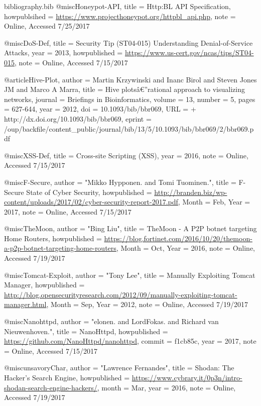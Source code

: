 \begin{filecontents}{bibliography.bib}
@misc{Honeypot-API,
    title = {{Http:BL API Specification}},
    howpublsihed = {\url{https://www.projecthoneypot.org/httpbl_api.php}},
    note = {Online, Accessed 7/25/2017}
}

@misc{DoS-Def,
    title = {{Security Tip (ST04-015) Understanding Denial-of-Service Attacks}},
    year = {2013},
    howpublished = {\url{https://www.us-cert.gov/ncas/tips/ST04-015}},
    note = {Online, Accessed 7/15/2017}
}

@article{Hive-Plot,
    author = {Martin Krzywinski and Inanc Birol and Steven Jones JM and Marco A Marra},
    title = {Hive plotsâ€”rational approach to visualizing networks},
    journal = {Briefings in Bioinformatics},
    volume = {13},
    number = {5},
    pages = {627-644},
    year = {2012},
    doi = {10.1093/bib/bbr069},
    URL = { + http://dx.doi.org/10.1093/bib/bbr069},
    eprint = {/oup/backfile/content_public/journal/bib/13/5/10.1093/bib/bbr069/2/bbr069.pdf}
}

@misc{XSS-Def,
    title = {{Cross-site Scripting (XSS)}},
    year = {2016},
    note = {Online, Accessed 7/15/2017}
}

@misc{F-Secure,
    author = "{Mikko Hypponen. and Tomi Tuominen.}",
    title = {{F-Secure State of Cyber Security}},
    howpublished = {\url{http://branden.biz/wp-content/uploads/2017/02/cyber-security-report-2017.pdf}},
    Month = {Feb},
    Year = {2017},
    note = {Online, Accessed 7/15/2017}
}

@misc{TheMoon,
    author = "{Bing Liu}",
    title = {{TheMoon - A P2P botnet targeting Home Routers}},
    howpublished = {\url{https://blog.fortinet.com/2016/10/20/themoon-a-p2p-botnet-targeting-home-routers}},
    Month = {Oct},
    Year = {2016},
    note = {Online, Accessed 7/19/2017}
}

@misc{Tomcat-Exploit,
    author = "{Tony Lee}",
    title = {{Manually Exploiting Tomcat Manager}},
    howpublished = {\url{http://blog.opensecurityresearch.com/2012/09/manually-exploiting-tomcat-manager.html}},
    Month = {Sep},
    Year = {2012},
    note = {Online, Accessed 7/19/2017}
}

@misc{Nanohttpd,
    author = "{elonen. and LordFokas. and Richard van Nieuwenhoven.}",
    title = {{NanoHttpd}},
    howpublished = {\url{https://github.com/NanoHttpd/nanohttpd}},
    commit = {f1cb85c},
    year = {2017},
    note = {Online, Accessed 7/15/2017}
}

@misc{unsavoryChar,
    author = "{Lawrence Fernandes}",
    title = {{Shodan: The Hacker’s Search Engine}},
    howpublished = {\url{https://www.cybrary.it/0p3n/intro-shodan-search-engine-hackers/}},
    month = {Mar},
    year = {2016},
    note = {Online, Accessed 7/19/2017}
}


\end{filecontents}
